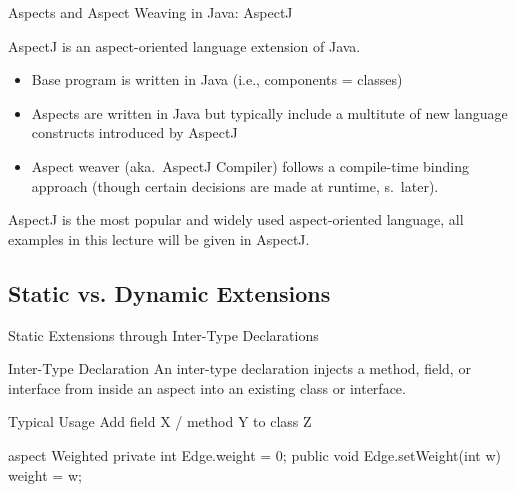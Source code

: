 \begin{frame}{Aspects and Aspect Weaving in Java: AspectJ}
	\begin{fancycolumns}[animation=none]
		\begin{definition}{}
			AspectJ is an aspect-oriented language extension of Java.
			\begin{itemize}
				\item Base program is written in Java (i.e., components = classes)
				\item Aspects are written in Java but typically include a multitute of new language constructs introduced by AspectJ
				\item Aspect weaver (aka.\ AspectJ Compiler) follows a compile-time binding approach (though certain decisions are made at runtime, s.\ later).
			\end{itemize}
		\end{definition}
		\begin{note}{}
			AspectJ is the most popular and widely used aspect-oriented language, all examples in this lecture will be given in AspectJ.
		\end{note}
	\nextcolumn
		\begin{exampletight}{}
			\centering
		\end{exampletight}
	\end{fancycolumns}
\end{frame}

\subsection{Static vs. Dynamic Extensions}

\begin{frame}[fragile]{Static Extensions through Inter-Type Declarations}
	\begin{fancycolumns}[animation=none]
		\begin{definition}{Inter-Type Declaration }
			An inter-type declaration  injects a method, field, or interface from inside an aspect into an existing class or interface.
		\end{definition}
		\begin{note}{Typical Usage}
			Add field X / method Y to class Z
		\end{note}
	\nextcolumn
\begin{codetight}{}
aspect Weighted {
	private int Edge.weight = 0;
	public void Edge.setWeight(int w) {
		weight = w;
	}
}
\end{codetight}
	\end{fancycolumns}
\end{frame}

